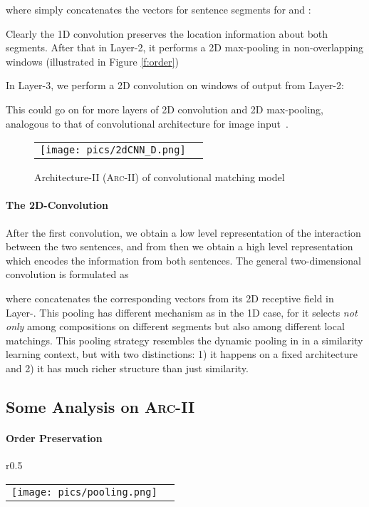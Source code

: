 \documentclass{article} \usepackage{nips14submit_e,times}
\newcommand{\0}{\ensuremath{\mathbf{0}}}
\newcommand{\1}{\ensuremath{\mathbf{1}}}
\begin{document}
where  simply concatenates the vectors for sentence segments for  and :

Clearly the 1D convolution preserves the location information about both segments. After that in Layer-2, it performs a 2D max-pooling in non-overlapping  windows (illustrated in Figure \ref{f:order})

In Layer-3, we perform a 2D convolution on  windows of output from Layer-2:

This could go on for more layers of 2D convolution and 2D max-pooling, analogous to that of convolutional architecture for image input~\cite{cnn}.

\begin{figure}[h!]
\begin{center}
    \begin{tabular}[c]{cc}
      \texttt{[image: pics/2dCNN\_D.png]}
\end{tabular}
    \caption{Architecture-II (\textsc{Arc-II}) of convolutional matching model}
    \label{f:2DCNN}
  \end{center} \vspace{-10pt}
\end{figure}
\paragraph{The 2D-Convolution} After the first convolution, we obtain a low level representation of the interaction between the two sentences, and from then we obtain a high level representation  which encodes the information from both sentences. The general two-dimensional convolution is formulated as

where  concatenates the corresponding vectors from its 2D receptive field in Layer-. This pooling has different mechanism as in the 1D case, for it selects \emph{not only} among compositions on different segments but also among different local matchings. This pooling strategy resembles the dynamic pooling in \cite{socher2011} in a similarity learning context, but with two distinctions: 1) it happens on a fixed architecture and 2) it has much richer structure than just similarity.


\subsection{Some Analysis on \textsc{Arc-II}}\vspace{-5pt}
\paragraph{Order Preservation}
\begin{wrapfigure}{r}{0.5\textwidth}
\begin{center}
\begin{tabular}[c]{cc}
     \texttt{[image: pics/pooling.png]} \end{tabular}
\caption{Order preserving in 2D-pooling.} \label{f:order}
  \end{center}
\vspace{-10pt}
\end{wrapfigure}
\end{document}
